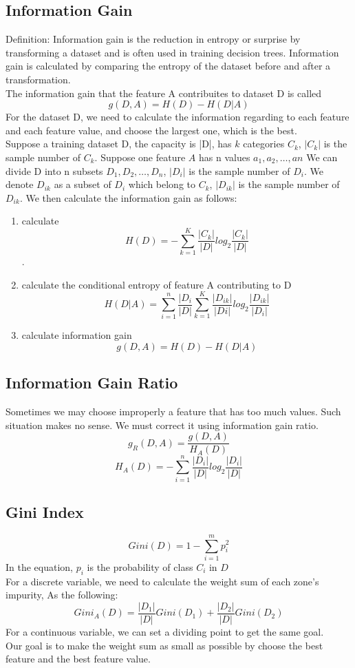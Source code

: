 \documentclass[50pt]{article}
\begin{document}
\subsection{Information Gain}
    Definition: Information gain is the reduction in entropy or surprise by transforming 
    a dataset and is often used in training decision trees. Information gain is calculated 
    by comparing the entropy of the dataset before and after a transformation.\\
    The information gain that the feature A contribuites to dataset D is called 
    $$g(D, A) = H(D) - H(D|A)$$
    For the dataset D, we need to calculate the information regarding to each feature and
    each feature value, and choose the largest one, which is the best.\\
    Suppose a training dataset D, the capacity is |D|, has $k$ categories $C_k$, $|C_k|$
    is the sample number of $C_k$. Suppose one feature $A$ has n values $a_{1},a_{2},\dots, a{n}$
     We can divide D into n subsets $D_{1}, D_{2}, \dots, D_{n}$, $|D_{i}|$ is 
     the sample number of $D_{i}$. We denote $D_{ik}$ as a subset of $D_{i}$ which belong to
     $C_{k}$, $|D_{ik}|$ is the sample number of $D_{ik}$. We then calculate the information 
     gain as follows:\\
     \begin{enumerate}
         \item calculate $$H(D) = -\sum_{k=1}^{K}\frac{|C_{k}|}{|D|}log_{2}\frac{|C_{k}|}{|D|}$$.
         \item calculate the conditional entropy of feature A contributing to D 
         $$H(D|A) = \sum_{i=1}^{n}\frac{|D_{i}}{|D|}\sum_{k=1}^{K}\frac{|D_{ik}|}{|D{i}|}log_{2}\frac{|D_{ik}|}{|D_{i}|}$$
         \item calculate information gain $$g(D,A) = H(D) - H(D|A)$$
     \end{enumerate}
\subsection{Information Gain Ratio}
     Sometimes we may choose improperly a feature that has too much values. Such situation makes no sense.
     We must correct it using information gain ratio.
     $$g_{R}(D,A) = \frac{g(D,A)}{H_{A}(D)}$$
     $$H_{A}(D) = -\sum_{i=1}^{n}\frac{|D_{i}|}{|D|} log_{2}\frac{|D_{i}|}{|D|}$$
\subsection{Gini Index}
    $$Gini(D) = 1 - \sum_{i=1}^{m}p^{2}_{i}$$
    In the equation, $p_i$ is the probability of class $C_i$ in $D$\\
    For a discrete variable, we need to calculate the weight sum of each zone's impurity, As the following:
    $$Gini_{A}(D) = \frac{|D_1|}{|D|}Gini(D_1) + \frac{|D_2|}{|D|}Gini(D_2)$$
    For a continuous variable, we can set a dividing point to get the same goal.\\
    Our goal is to make the weight sum as small as possible by choose the best feature and
    the best feature value.
\end{document}
